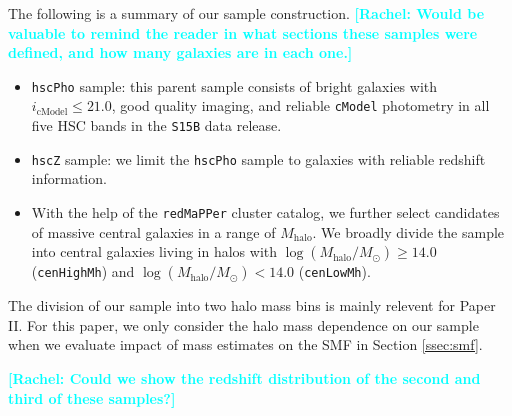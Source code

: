 \documentclass[a4paper,fleqn,usenatbib]{mnras}
\def\redm{\texttt{redMaPPer}}
\def\rbcg{\texttt{cenHighMh}}
\def\nbcg{\texttt{cenLowMh}}
\def\mhalo{{$M_{\mathrm{halo}}$}}
\def\logmh{{$\log (M_{\mathrm{halo}}/M_{\odot})$}}
\newcommand{\rachel}[1]{\textcolor{cyan}{\textbf{[Rachel: #1]}}}
\begin{document}
    The following is a summary of our sample construction. \rachel{Would be valuable to remind the reader in what sections these samples were defined, and how many galaxies are in each one.}
    
    \begin{itemize}
        \item \texttt{hscPho} sample: this parent sample consists of bright galaxies 
            with $i_{\mathrm{cModel}} \leq 21.0$, good quality imaging, and reliable 
            \texttt{cModel} photometry in all five HSC bands in the \texttt{S15B} 
            data release. 
        \item \texttt{hscZ} sample: we limit the \texttt{hscPho} sample to galaxies 
            with reliable redshift information. 
        \item With the help of the \redm{} cluster catalog, we further select 
            candidates of massive central galaxies in a range of \mhalo{}.
            We broadly divide the sample into central galaxies living in halos
            with \logmh{}$\geq 14.0$ (\rbcg{}) and \logmh{}$<14.0$ (\nbcg{}). 
    \end{itemize}
    
    The  division of our sample into two halo mass bins is mainly relevent for Paper II.  For this paper, we only consider the halo mass dependence on our sample when we evaluate impact of  mass estimates on the SMF in Section \ref{ssec:smf}. 

\rachel{Could we show the redshift distribution of the second and third of these samples?}

\end{document}
